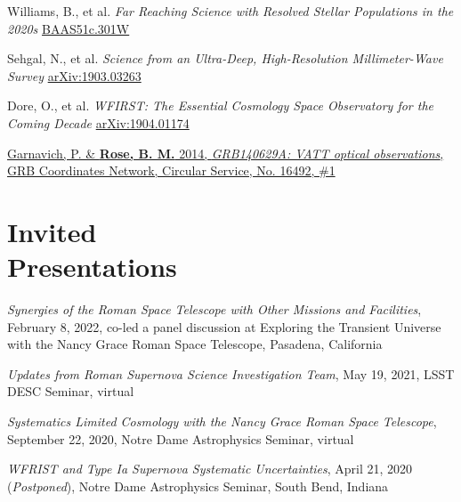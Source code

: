 \documentclass[margin]{res}
\begin{document}
\begin{resume}
\vspace{-12pt}\hspace{15pt}\hangindent=30pt 
Williams, B., et al. \textit{Far Reaching Science with Resolved Stellar Populations in the 2020s}
\href{https://ui.adsabs.harvard.edu/abs/2019BAAS...51c.301W/abstract}{BAAS51c.301W}

\vspace{-12pt}\hspace{15pt}\hangindent=30pt 
Sehgal, N., et al. \textit{Science from an Ultra-Deep, High-Resolution Millimeter-Wave Survey}
\href{https://ui.adsabs.harvard.edu/abs/2019arXiv190303263S/abstract}{arXiv:1903.03263}

\vspace{-12pt}\hspace{15pt}\hangindent=30pt 
Dore, O., et al. \textit{WFIRST: The Essential Cosmology Space Observatory for the Coming Decade}
\href{https://ui.adsabs.harvard.edu/abs/2019arXiv190401174D/abstract}{arXiv:1904.01174}

\vspace{-12pt}
\hangindent=15pt \href{https://ui.adsabs.harvard.edu/abs/2014GCN..16492...1G/abstract}{Garnavich, P. \& {\bf Rose, B. M.} 2014, {\sl GRB140629A: VATT optical observations}, GRB Coordinates Network, Circular Service, No. 16492, \#1}




\section{Invited \\Presentations}

\hangindent=15pt 
\textit{Synergies of the Roman Space Telescope with Other Missions and Facilities}, February 8, 2022, co-led a panel discussion at Exploring the Transient Universe with the Nancy Grace Roman Space Telescope, Pasadena, California
\vspace{-12pt}

\hangindent=15pt 
{\it Updates from Roman Supernova Science Investigation Team}, May 19, 2021, LSST DESC Seminar, virtual
\vspace{-12pt}

\hangindent=15pt 
{\it Systematics Limited Cosmology with the Nancy Grace Roman Space Telescope}, September 22, 2020, Notre Dame Astrophysics Seminar, virtual
\vspace{-12pt}

\hangindent=15pt 
{\it WFRIST and Type Ia Supernova Systematic Uncertainties}, April 21, 2020 (\textit{Postponed}), Notre Dame Astrophysics Seminar, South Bend, Indiana
\vspace{-12pt}


\end{resume}
\end{document}
